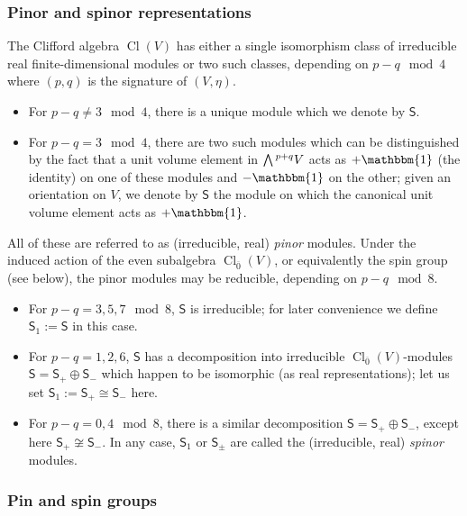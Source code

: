 \documentclass[pdftex]{sigma}
\numberwithin{equation}{section}
\newcommand{\ssS}{\mathsf{S}}
\newcommand{\Wedge}{\mathchoice{{\textstyle\bigwedge}}{\bigwedge}{\bigwedge}{\bigwedge}}	%
\newcommand{\1}{\mathbbm{1}}
\DeclareMathOperator{\Cl}{Cl}
\begin{document}
\subsubsection{Pinor and spinor representations}
\label{sec:pinor-spinor}

The Clifford algebra $\Cl(V)$ has either a single isomorphism class of irreducible real finite-dimensional modules or two such classes, depending on $p-q\mod 4$ where $(p,q)$ is the signature of $(V,\eta)$.
\begin{itemize}\itemsep=0pt
	\item For $p-q\neq 3\mod 4$, there is a unique module which we denote by $\ssS$.
	\item For $p-q = 3 \mod 4$, there are two such modules which can be distinguished by the fact that a unit volume element in $\Wedge^{p+q}V$ acts as $+\1$ (the identity) on one of these modules and $-\1$ on the other; given an orientation on $V$, we denote by $\ssS$ the module on which the canonical unit volume element acts as $+\1$.
\end{itemize}
All of these are referred to as (irreducible, real) \emph{pinor} modules. Under the induced action of the even subalgebra $\Cl_{\overline 0}(V)$, or equivalently the spin group (see below), the pinor modules may be reducible, depending on $p-q\mod 8$.
\begin{itemize}\itemsep=0pt
	\item For $p-q=3,5,7 \mod 8$, $\ssS$ is irreducible; for later convenience we define $\ssS_1:=\ssS$ in this case.
	\item For $p-q=1,2,6$, $\ssS$ has a decomposition into irreducible $\Cl_{\overline0}(V)$-modules $\ssS=\ssS_+\oplus\ssS_-$ which happen to be isomorphic (as real representations); let us set $\ssS_1:=\ssS_+\cong\ssS_-$ here.
	\item For $p-q=0,4\mod 8$, there is a similar decomposition $\ssS=\ssS_+\oplus\ssS_-$, except here $\ssS_+\not\cong\ssS_-$. In any case, $\ssS_1$ or $\ssS_\pm$ are called the (irreducible, real) \emph{spinor} modules.
\end{itemize}

\subsubsection{Pin and spin groups}
\label{sec:pin-spin-group}
\end{document}
